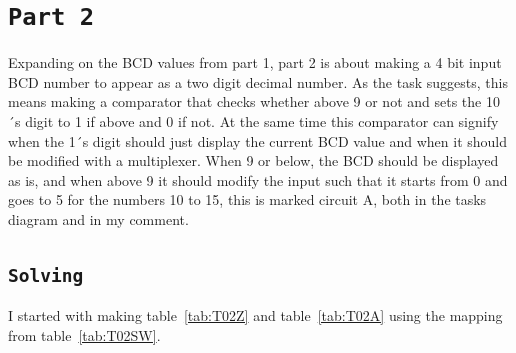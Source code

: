 \documentclass{article}
\let\oldsection\section
\renewcommand{\section}[1]{%
  \oldsection{\texttt{#1}} %
  \setcounter{subsection}{-1} %
  \setcounter{figure}{-1} %
  \setcounter{table}{-1} %
}
\let\oldsubsection\subsection
\renewcommand{\subsection}[1]{%
  \oldsubsection{\texttt{#1}}%
  \setcounter{subsubsection}{-1}%
}
\begin{document}
\section{Part 2}
Expanding on the BCD values from part 1, part 2 is about making a 4 bit input BCD number to appear as a two digit decimal number. As the task suggests, this means making a comparator that checks whether above 9 or not and sets the 10´s digit to 1 if above and 0 if not. At the same time this comparator can signify when the 1´s digit should just display the current BCD value and when it should be modified with a multiplexer. When 9 or below, the BCD should be displayed as is, and when above 9 it should modify the input such that it starts from 0 and goes to 5 for the numbers 10 to 15, this is marked circuit A, both in the tasks diagram and in my comment.

\subsection{Solving}
I started with making table~\ref{tab:T02Z} and table~\ref{tab:T02A} using the mapping from table~\ref{tab:T02SW}.
\end{document}
